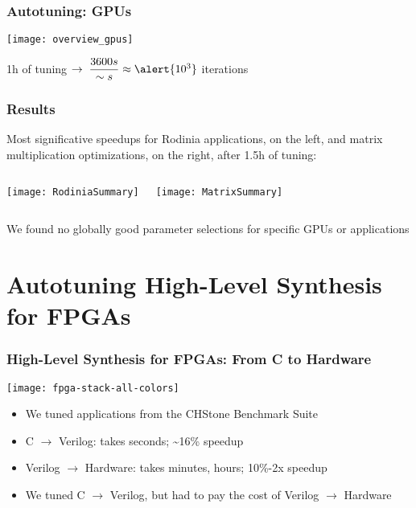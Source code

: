 \documentclass[10pt, compress, aspectratio=169]{beamer}
\begin{document}
\begin{frame}
    \frametitle{Autotuning: GPUs}
    \begin{center}
        \texttt{[image: overview\_gpus]}

        \alert{1h} of tuning $\rightarrow \; \dfrac{3600s}{\sim{}s} \approx \alert{10^3}$ \alert{iterations}
    \end{center}
\end{frame}

\begin{frame}
    \frametitle{Results}
    \alert{Most significative speedups} for \alert{Rodinia applications}, on the left,
    and \alert{matrix multiplication optimizations}, on the right, after \alert{1.5h of tuning}:
    \begin{columns}[T,onlytextwidth]
        \vspace{0.57cm}
        \begin{center}
            \texttt{[image: RodiniaSummary]}
        \end{center}

        \begin{center}
            \texttt{[image: MatrixSummary]}
        \end{center}

    \end{columns}
    We \alert{found no globally good parameter selections} for specific GPUs or applications
\end{frame}

\section{Autotuning High-Level Synthesis for FPGAs}

\begin{frame}
    \frametitle{High-Level Synthesis for FPGAs: From C to Hardware}
    \begin{center}
        \texttt{[image: fpga-stack-all-colors]}
    \end{center}

    \begin{itemize}
        \item We tuned applications from the \alert{CHStone Benchmark Suite}
        \item C $\rightarrow$ Verilog: takes \alert{seconds}; \alert{\textasciitilde16\% speedup}
        \item Verilog $\rightarrow$ Hardware: takes \alert{minutes}, \alert{hours}; \alert{10\%-2x speedup}
        \item We tuned C $\rightarrow$ Verilog, but had \alert{to pay the cost} of Verilog $\rightarrow$ Hardware
    \end{itemize}
\end{frame}
\end{document}
